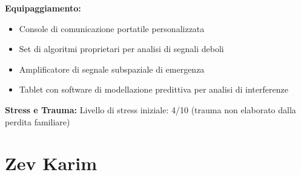 \documentclass[11pt,a4paper]{article}
\begin{document}
\begin{tcolorbox}[colback=mininglightorange!20, colframe=miningorange]
\textbf{Equipaggiamento:}
\begin{itemize}[leftmargin=*]
\item Console di comunicazione portatile personalizzata
\item Set di algoritmi proprietari per analisi di segnali deboli
\item Amplificatore di segnale subspaziale di emergenza
\item Tablet con software di modellazione predittiva per analisi di interferenze
\end{itemize}

\textbf{Stress e Trauma:} Livello di stress iniziale: 4/10 (trauma non elaborato dalla perdita familiare)
\end{tcolorbox}

\section{Zev Karim}
\end{document}
